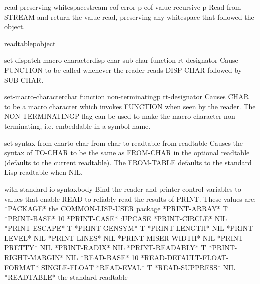 \begin{function}{read-preserving-whitespace}{\op stream eof-error-p eof-value recursive-p}{}{}
  Read from STREAM and return the value read, preserving any whitespace
   that followed the object.
\end{function}

\begin{function}{readtablep}{object}{}{}
  
\end{function}

\begin{function}{set-dispatch-macro-character}{disp-char sub-char function \op rt-designator}{}{}
  Cause FUNCTION to be called whenever the reader reads DISP-CHAR
   followed by SUB-CHAR.
\end{function}

\begin{function}{set-macro-character}{char function \op non-terminatingp rt-designator}{}{}
  Causes CHAR to be a macro character which invokes FUNCTION when seen
   by the reader. The NON-TERMINATINGP flag can be used to make the macro
   character non-terminating, i.e. embeddable in a symbol name.
\end{function}

\begin{function}{set-syntax-from-char}{to-char from-char \op to-readtable from-readtable}{}{}
  Causes the syntax of TO-CHAR to be the same as FROM-CHAR in the optional
readtable (defaults to the current readtable). The FROM-TABLE defaults to the
standard Lisp readtable when NIL.
\end{function}

\begin{macro}{with-standard-io-syntax}{\body body}{}{}
  Bind the reader and printer control variables to values that enable READ
   to reliably read the results of PRINT. These values are:
       *PACKAGE*                        the COMMON-LISP-USER package
       *PRINT-ARRAY*                    T
       *PRINT-BASE*                     10
       *PRINT-CASE*                     :UPCASE
       *PRINT-CIRCLE*                   NIL
       *PRINT-ESCAPE*                   T
       *PRINT-GENSYM*                   T
       *PRINT-LENGTH*                   NIL
       *PRINT-LEVEL*                    NIL
       *PRINT-LINES*                    NIL
       *PRINT-MISER-WIDTH*              NIL
       *PRINT-PRETTY*                   NIL
       *PRINT-RADIX*                    NIL
       *PRINT-READABLY*                 T
       *PRINT-RIGHT-MARGIN*             NIL
       *READ-BASE*                      10
       *READ-DEFAULT-FLOAT-FORMAT*      SINGLE-FLOAT
       *READ-EVAL*                      T
       *READ-SUPPRESS*                  NIL
       *READTABLE*                      the standard readtable
\end{macro}

